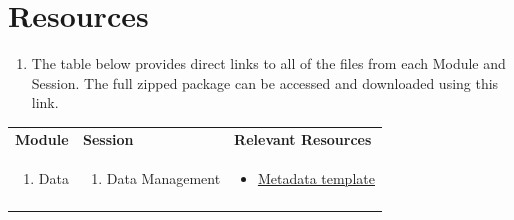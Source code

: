 \documentclass[
]{book}
\providecommand{\tightlist}{%
  \setlength{\itemsep}{0pt}\setlength{\parskip}{0pt}}
\begin{document}
\hypertarget{resources}{%
\section{Resources}\label{resources}}

\begin{enumerate}
\def\labelenumi{\arabic{enumi}.}
\tightlist
\item
  The table below provides direct links to all of the files from each Module and Session. The full zipped package can be accessed and downloaded using this link.
\end{enumerate}

\begin{longtable}[]{@{}lll@{}}
\toprule
\endhead
\begin{minipage}[t]{0.15\columnwidth}\raggedright
\textbf{Module}\strut
\end{minipage} & \begin{minipage}[t]{0.34\columnwidth}\raggedright
\textbf{Session}\strut
\end{minipage} & \begin{minipage}[t]{0.42\columnwidth}\raggedright
\textbf{Relevant Resources}\strut
\end{minipage}\tabularnewline
\begin{minipage}[t]{0.15\columnwidth}\raggedright
\begin{enumerate}
\def\labelenumi{\arabic{enumi}.}
\setcounter{enumi}{1}
\tightlist
\item
  Data
\end{enumerate}\strut
\end{minipage} & \begin{minipage}[t]{0.34\columnwidth}\raggedright
\begin{enumerate}
\def\labelenumi{\arabic{enumi}.}
\tightlist
\item
  Data Management
\end{enumerate}\strut
\end{minipage} & \begin{minipage}[t]{0.42\columnwidth}\raggedright
\begin{itemize}
\tightlist
\item
  \href{files/metadata_template_blank.xlsx}{Metadata template}
\end{itemize}\strut
\end{minipage}\tabularnewline
\begin{minipage}[t]{0.15\columnwidth}\raggedright
\strut
\end{minipage} & \begin{minipage}[t]{0.34\columnwidth}\raggedright

\end{minipage}
\end{longtable}
\end{document}
